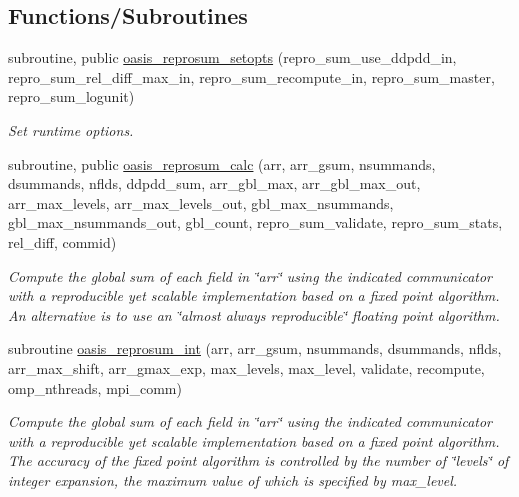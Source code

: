 \subsection*{Functions/\+Subroutines}
\begin{DoxyCompactItemize}
\item 
subroutine, public \hyperlink{namespacemod__oasis__reprosum_ad6b4914497a4961339a1c95bfb807660}{oasis\+\_\+reprosum\+\_\+setopts} (repro\+\_\+sum\+\_\+use\+\_\+ddpdd\+\_\+in, repro\+\_\+sum\+\_\+rel\+\_\+diff\+\_\+max\+\_\+in, repro\+\_\+sum\+\_\+recompute\+\_\+in, repro\+\_\+sum\+\_\+master, repro\+\_\+sum\+\_\+logunit)
\begin{DoxyCompactList}\small\item\em Set runtime options. \end{DoxyCompactList}\item 
subroutine, public \hyperlink{namespacemod__oasis__reprosum_a398280c78cff126b7622dbd96af675e4}{oasis\+\_\+reprosum\+\_\+calc} (arr, arr\+\_\+gsum, nsummands, dsummands, nflds, ddpdd\+\_\+sum, arr\+\_\+gbl\+\_\+max, arr\+\_\+gbl\+\_\+max\+\_\+out, arr\+\_\+max\+\_\+levels, arr\+\_\+max\+\_\+levels\+\_\+out, gbl\+\_\+max\+\_\+nsummands, gbl\+\_\+max\+\_\+nsummands\+\_\+out, gbl\+\_\+count, repro\+\_\+sum\+\_\+validate, repro\+\_\+sum\+\_\+stats, rel\+\_\+diff, commid)
\begin{DoxyCompactList}\small\item\em Compute the global sum of each field in \char`\"{}arr\char`\"{} using the indicated communicator with a reproducible yet scalable implementation based on a fixed point algorithm. An alternative is to use an \char`\"{}almost
 always reproducible\char`\"{} floating point algorithm. \end{DoxyCompactList}\item 
subroutine \hyperlink{namespacemod__oasis__reprosum_a7ea3c5bad9db10c80eb528453602aed3}{oasis\+\_\+reprosum\+\_\+int} (arr, arr\+\_\+gsum, nsummands, dsummands, nflds, arr\+\_\+max\+\_\+shift, arr\+\_\+gmax\+\_\+exp, max\+\_\+levels, max\+\_\+level, validate, recompute, omp\+\_\+nthreads, mpi\+\_\+comm)
\begin{DoxyCompactList}\small\item\em Compute the global sum of each field in \char`\"{}arr\char`\"{} using the indicated communicator with a reproducible yet scalable implementation based on a fixed point algorithm. The accuracy of the fixed point algorithm is controlled by the number of \char`\"{}levels\char`\"{} of integer expansion, the maximum value of which is specified by max\+\_\+level. \end{DoxyCompactList}\item 

\end{DoxyCompactItemize}

